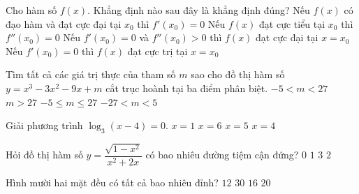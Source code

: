 \begin{ex}%
	Cho hàm số $ f(x) $. Khẳng định nào sau đây là khẳng định đúng?
	\choice
	{ \True Nếu $ f(x) $ có đạo hàm và đạt cực đại tại $ x_0 $ thì $ f'(x_0) = 0 $}
	{ Nếu $ f(x) $ đạt cực tiểu tại $ x_0 $ thì $ f''(x_0)  = 0 $}
	{ Nếu $ f'(x_0) = 0 $ và $ f''(x_0) > 0 $ thì $ f(x) $ đạt cực đại tại $ x = x_0 $ }
	{ Nếu $ f'(x_0) = 0 $ thì $ f(x) $ đạt cực trị tại $ x = x_0 $ }
\end{ex}
\begin{ex}%
	Tìm tất cả các giá trị thực của tham số $ m $ sao cho đồ thị hàm số $ y = x^3 - 3x^2 - 9x + m $ cắt trục hoành tại ba điểm phân biệt.
	\choice
	{ \True $ -5 < m < 27 $}
	{$ m > 27 $}
	{$ -5 \leq m \leq 27  $}
	{$ -27 < m < 5 $}
\end{ex}
\begin{ex}%
	Giải phương trình $ \log_3 (x-4) = 0 $.
	\choice
	{$ x = 1 $}
	{$ x = 6 $}
	{ \True $ x = 5 $}
	{$ x = 4 $ }
\end{ex}
\begin{ex}%
	Hỏi đồ thị hàm số $ y = \dfrac{ \sqrt{1 - x^2} }{x^2 + 2x} $ có bao nhiêu đường tiệm cận đứng?
	\choice
	{$ 0 $}
	{ \True $ 1 $}
	{$ 3 $}
	{$ 2 $}
\end{ex}
\begin{ex}%
	Hình mười hai mặt đều có tất cả bao nhiêu đỉnh?
	\choice
	{$ 12 $}
	{$ 30 $}
	{$ 16 $}
	{ \True $ 20 $}
\end{ex}
